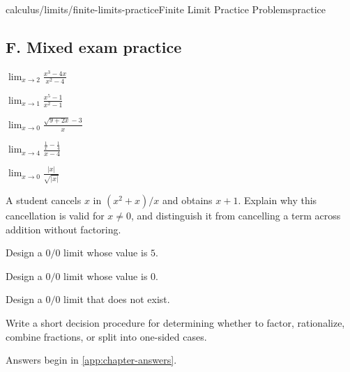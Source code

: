 \begin{webpage}{calculus/limits/finite-limits-practice}{Finite Limit Practice Problems}{practice}
\subsection*{F. Mixed exam practice}
\begin{bgexercises}[label=\textbf{2.\arabic*},resume]
  \item \(\displaystyle\lim_{x\to2}\frac{x^3-4x}{x^2-4}\)
  \item \(\displaystyle\lim_{x\to1}\frac{x^5-1}{x^2-1}\)
  \item \(\displaystyle\lim_{x\to0}\frac{\sqrt{9+2x}-3}{x}\)
  \item \(\displaystyle\lim_{x\to4}\frac{\frac1x-\frac14}{x-4}\)
  \item \(\displaystyle\lim_{x\to0}\frac{|x|}{\sqrt{|x|}}\)
  \item A student cancels \(x\) in \((x^2+x)/x\) and obtains \(x+1\). Explain why this cancellation is valid for \(x\ne0\), and distinguish it from cancelling a term across addition without factoring.
  \item Design a \(0/0\) limit whose value is \(5\).
  \item Design a \(0/0\) limit whose value is \(0\).
  \item Design a \(0/0\) limit that does not exist.
  \item Write a short decision procedure for determining whether to factor, rationalize, combine fractions, or split into one-sided cases.
\end{bgexercises}

Answers begin in \cref{app:chapter-answers}.
\end{webpage}
